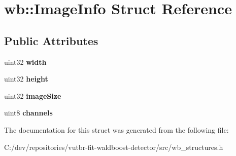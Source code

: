 \hypertarget{structwb_1_1_image_info}{}\section{wb\+:\+:Image\+Info Struct Reference}
\label{structwb_1_1_image_info}
\subsection*{Public Attributes}
\begin{DoxyCompactItemize}
\item 
\hypertarget{structwb_1_1_image_info_a629c5215481a56a39d3819ac70eb96fd}{}uint32 {\bfseries width}\label{structwb_1_1_image_info_a629c5215481a56a39d3819ac70eb96fd}

\item 
\hypertarget{structwb_1_1_image_info_a71583144f71c29cc52e41962bdda2064}{}uint32 {\bfseries height}\label{structwb_1_1_image_info_a71583144f71c29cc52e41962bdda2064}

\item 
\hypertarget{structwb_1_1_image_info_a91228be9269e2986a58659ce8834c9ab}{}uint32 {\bfseries image\+Size}\label{structwb_1_1_image_info_a91228be9269e2986a58659ce8834c9ab}

\item 
\hypertarget{structwb_1_1_image_info_a444f6eebaf1472a45df05657f05ed1e1}{}uint8 {\bfseries channels}\label{structwb_1_1_image_info_a444f6eebaf1472a45df05657f05ed1e1}

\end{DoxyCompactItemize}


The documentation for this struct was generated from the following file\+:\begin{DoxyCompactItemize}
\item 
C\+:/dev/repositories/vutbr-\/fit-\/waldboost-\/detector/src/wb\+\_\+structures.\+h\end{DoxyCompactItemize}
